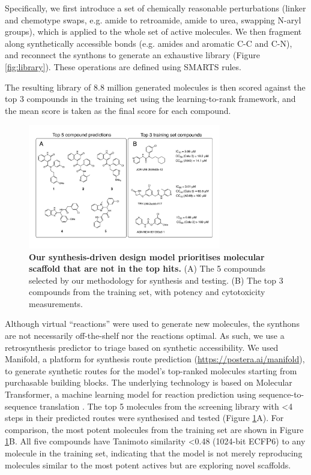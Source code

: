 Specifically, we first introduce a set of chemically reasonable perturbations (linker and chemotype swaps, e.g. amide to retroamide, amide to urea, swapping N-aryl groups), which is applied to the whole set of active molecules. We then fragment along synthetically accessible bonds (e.g. amides and aromatic C-C and C-N), and reconnect the synthons to generate an exhaustive library (Figure \ref{fig:library}). These operations are defined using SMARTS rules.

The resulting library of 8.8 million generated molecules is then scored against the top 3 compounds in the training set using the learning-to-rank framework, and the mean score is taken as the final score for each compound.

\begin{figure}[!bh]
    \centering
        \includegraphics[width=0.75\textwidth]{Chapters/Ranking/Figs/fig2.pdf}
        \caption{\textbf{Our synthesis-driven design model prioritises molecular scaffold that are not in the top hits.} (A) The 5 compounds selected by our methodology for synthesis and testing. (B) The top 3 compounds from the training set, with potency and cytotoxicity measurements.}
        \label{fig:compounds}
\end{figure}

Although virtual ``reactions'' were used to generate new molecules, the synthons are not necessarily off-the-shelf nor the reactions optimal. As such, we use a retrosynthesis predictor to triage based on synthetic accessibility. We used Manifold, a platform for synthesis route prediction (\url{https://postera.ai/manifold}), to generate synthetic routes for the model's top-ranked molecules starting from purchasable building blocks. The underlying technology is based on Molecular Transformer, a machine learning model for reaction prediction using sequence-to-sequence translation \citep{yang2019molecular,schwaller2019molecular}. The top 5 molecules from the screening library with <4 steps in their predicted routes were synthesised and tested (Figure \ref{fig:compounds}A). For comparison, the most potent molecules from the training set are shown in Figure \ref{fig:compounds}B. All five compounds have Tanimoto similarity <0.48 (1024-bit ECFP6) to any molecule in the training set, indicating that the model is not merely reproducing molecules similar to the most potent actives but are exploring novel scaffolds.

